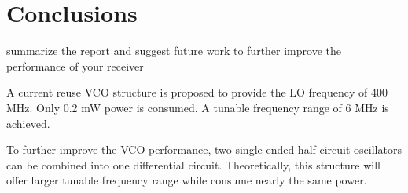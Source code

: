 \section{Conclusions}
summarize the report and suggest future work to further improve the performance of your receiver

A current reuse VCO structure is proposed to provide the LO frequency of 400 MHz. Only 0.2 mW power is consumed. A tunable frequency range of 6 MHz is achieved. 

To further improve the VCO performance, two single-ended half-circuit oscillators can be combined into one differential circuit. Theoretically, this structure will offer larger tunable frequency range while consume nearly the same power.